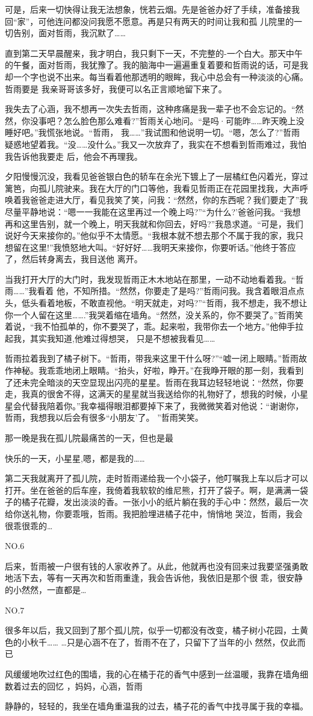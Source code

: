 \documentclass{article}
\begin{document}
可是，后来一切快得让我无法想象，恍若云烟。先是爸爸办好了手续，准备接我回“家”，可他连问都没问我愿不愿意。再是只有两天的时间让我和孤
儿院里的一切告别，面对哲雨，我沉默了…… 

直到第二天早晨醒来，我才明白，我只剩下一天，不完整的-一个白大。那天中午的午餐，面对哲雨，我犹豫了。我的脑海中一遍遍重复着要和哲雨说的话，可是我却一个字也说不出来。每当看着他那透明的眼眸，我心中总会有一种淡淡的心痛。哲雨要是
我亲哥哥该多好，我便可以名正言顺地留下来了。 

我失去了心涵，我不想再一次失去哲雨，这种疼痛是我一辈子也不会忘记的。“然然，你没事吧？怎么脸色那么难看?”哲雨关心地问。“是吗·可能昨……昨天晚上没睡好吧。”我慌张地说。“哲雨，
\newpage
我……”我试图和他说明一切。“嗯，怎么了?”哲雨疑惑地望着我。“没……没什么。”我又一次放弃了，我实在不想看到哲雨难过，我怕我告诉他我要走
后，他会不再理我。 

夕阳慢慢沉没，我看见爸爸银白色的轿车在余光下镀上了一层橘红色闪着光，穿过篱笆，向孤儿院驶来。我在大厅的门口等他，我看见哲雨正在花园里找我，大声呼唤着我爸爸走进大厅，看见我笑了笑，问我：“然然，你的东西呢？我们要走了”我尽量平静地说：“嗯一一我能在这里再过一个晚上吗?”“为什么?’爸爸问我。“我想再和这里告别，就一个晚上，明天我就和你回去，好吗?”我恳求道。“可是，我们说好今天来接你的。”他似乎不太情愿。“我根本就不想去那个不属于我的家，我只想留在这里!”我愤怒地大叫。“好好好……我明天来接你，你要听话。”他终于答应了，然后转身离去，我目送他
离开。 

当我打开大厅的大门时，我发现哲雨正木木地站在那里，一动不动地看着我。“哲雨……”我看着
\newpage
他，不知所措。“然然，你要走了是吗?”哲雨问我。我含着眼泪点点头，低头看着地板，不敢直视他。“明天就走，对吗?”“哲雨，我不想走，我不想让你一个人留在这里…….”我哭着缩在墙角。“然然，没关系的，你不要哭了。”哲雨笑着说，“我不怕孤单的，你不要哭了，乖。起来啦，我带你去一个地方。”他伸手拉起我，其实我知道,他难过得想哭，
只是不想被我看见…… 

哲雨拉着我到了橘子树下。“哲雨，带我来这里干什么呀?”“嘘一闭上眼睛。”哲雨故作神秘。我乖乖地闭上眼睛。“抬头，好啦，睁开。”在我睁开眼的那一刻，我看到了还未完全暗淡的天空显现出闪亮的星星。哲雨在我耳边轻轻地说：“然然，你要走，我真的很舍不得，这满天的星星就当我送给你的礼物好了，想我的时候，小星星会代替我陪着你。”我幸福得眼泪都要掉下来了，我微微笑着对他说：“谢谢你，哲雨，我想我以后会有很多“小朋友’了。
”哲雨笑笑。 

那一晚是我在孤儿院最痛苦的一天，但也是最
\newpage

快乐的一天，小星星,嗯，都是我的…… 

第二天我就离开了孤儿院，走时哲雨递给我一个小袋子，他叮嘱我上车以后才可以打开。坐在爸爸的后车座，我倚着我软软的维尼熊，打开了袋子。啊，是满满一袋子的橘子花瓣，发出淡淡的香。一张小小的纸片躺在我的手心中：然然，最后一次给你送礼物，你要乖哦，哲雨。我把脸埋进橘子花中，悄悄地
哭泣，哲雨，我会很乖很乖的… 


NO.6 

后来，哲雨被一户很有钱的人家收养了。从此，他就再也没有回来过我要坚强勇敢地活下去，等有一天再次和哲雨重逢，我会告诉他，我依旧是那个很
乖，很安静的小然然，一直都是… 


NO.7 

很多年以后，我又回到了那个孤儿院，似乎一切都没有改变，橘子树小花园，土黄色的小秋千……
\newpage
…只是心涵不在了，哲雨不在了，只留下了当年的小
然然，仅此而已 

风缓缓地吹过红色的围墙，我的心在橘于花的香气中感到一丝温暖，我靠在墙角细数着过去的回忆
，妈妈，心涵，哲雨 

静静的，轻轻的，我坐在墙角重温我的过去，橘子花的香气中找寻属于我的幸福。
\end{document}
